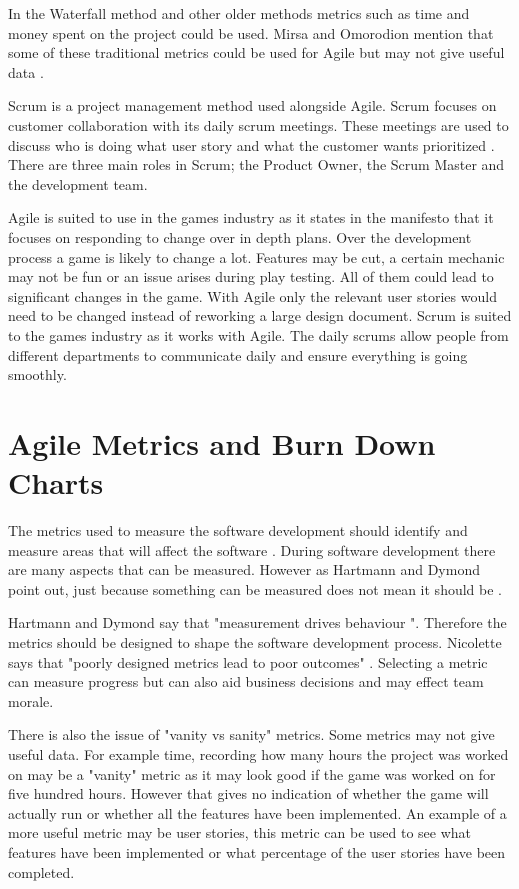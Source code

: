 \documentclass{scrartcl}
\begin{document}
In the Waterfall method and other older methods metrics such as time and money spent on the project could be used. Mirsa and Omorodion mention that some of these traditional metrics could be used for Agile but may not give useful data \cite{Misra}.

Scrum is a project management method used alongside Agile. Scrum focuses on customer collaboration with its daily scrum meetings. These meetings are used to discuss who is doing what user story and what the customer wants prioritized \cite{Sutherland}.
There are three main roles in Scrum; the Product Owner, the Scrum Master and the development team. \cite{Ktata}

Agile is suited to use in the games industry as it states in the manifesto that it focuses on responding to change over in depth plans. Over the development process a game is likely to change a lot. Features may be cut, a certain mechanic may not be fun or an issue arises during play testing. All of them could lead to significant changes in the game. With Agile only the relevant user stories would need to be changed instead of reworking a large design document. Scrum is suited to the games industry as it works with Agile. The daily scrums allow people from different departments to communicate daily and ensure everything is going smoothly.

\section{Agile Metrics and Burn Down Charts}

The metrics used to measure the software development should identify and measure areas that will affect the software \cite{Misra}.
During software development there are many aspects that can be measured. However as Hartmann and Dymond point out, just because something can be measured does not mean it should be \cite{Hartmann}.

Hartmann and Dymond say that "measurement drives behaviour "\cite{Hartmann}.  %
Therefore the metrics should be designed to shape the software development process. Nicolette says that "poorly designed metrics lead to poor outcomes" \cite[p.2]{Ktata}.  Selecting a metric can measure progress but can also aid business decisions and may effect team morale. %

There is also the issue of "vanity vs sanity" metrics. Some metrics may not give useful data. For example time, recording how many hours the project was worked on may be a "vanity" metric as it may look good if the game was worked on for five hundred hours. However that gives no indication of whether the game will actually run or whether all the features have been implemented. An example of a more useful metric may be user stories, this metric can be used to see what features have been implemented or what percentage of the user stories have been completed.
\end{document}

